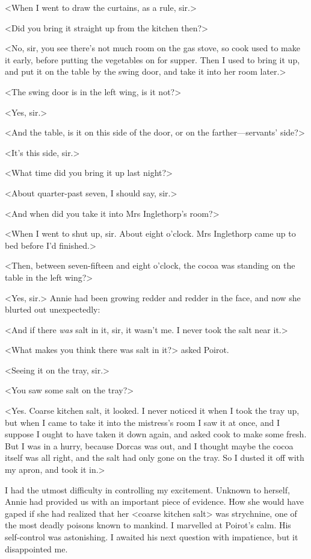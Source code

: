  <When I went to draw the curtains, as a rule, sir.> 

 <Did you bring it straight up from the kitchen then?> 

 <No, sir, you see there's not much room on the gas stove, so cook used to make it early, before putting the vegetables on for supper. Then I used to bring it up, and put it on the table by the swing door, and take it into her room later.> 

 <The swing door is in the left wing, is it not?> 

 <Yes, sir.> 

 <And the table, is it on this side of the door, or on the farther—servants' side?> 

 <It's this side, sir.> 

 <What time did you bring it up last night?> 

 <About quarter-past seven, I should say, sir.> 

 <And when did you take it into Mrs Inglethorp's room?> 

 <When I went to shut up, sir. About eight o'clock. Mrs Inglethorp came up to bed before I'd finished.> 

 <Then, between seven-fifteen and eight o'clock, the cocoa was standing on the table in the left wing?> 

 <Yes, sir.> Annie had been growing redder and redder in the face, and now she blurted out unexpectedly: 

 <And if there \emph{was} salt in it, sir, it wasn't me. I never took the salt near it.> 

 <What makes you think there was salt in it?> asked Poirot. 

 <Seeing it on the tray, sir.> 

 <You saw some salt on the tray?> 

 <Yes. Coarse kitchen salt, it looked. I never noticed it when I took the tray up, but when I came to take it into the mistress's room I saw it at once, and I suppose I ought to have taken it down again, and asked cook to make some fresh. But I was in a hurry, because Dorcas was out, and I thought maybe the cocoa itself was all right, and the salt had only gone on the tray. So I dusted it off with my apron, and took it in.> 

 I had the utmost difficulty in controlling my excitement. Unknown to herself, Annie had provided us with an important piece of evidence. How she would have gaped if she had realized that her <coarse kitchen salt> was strychnine, one of the most deadly poisons known to mankind. I marvelled at Poirot's calm. His self-control was astonishing. I awaited his next question with impatience, but it disappointed me. 


